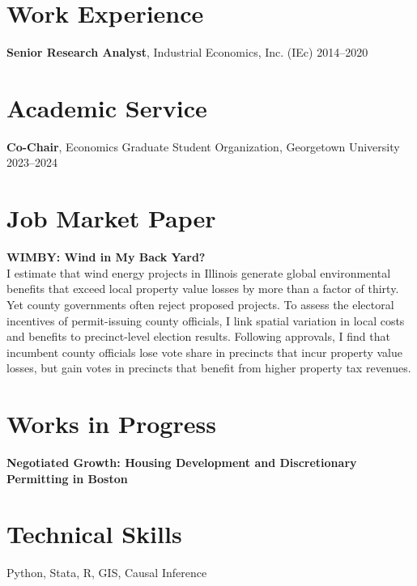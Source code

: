 \documentclass[11pt]{article}
\begin{document}
\section*{Work Experience}

\textbf{Senior Research Analyst}, Industrial Economics, Inc. (IEc) \hfill 2014–2020

\section*{Academic Service}

\textbf{Co-Chair}, Economics Graduate Student Organization, Georgetown University \hfill 2023–2024

\section*{Job Market Paper}

\textbf{WIMBY: Wind in My Back Yard?} \\
I estimate that wind energy projects in Illinois generate global environmental benefits that exceed local property value losses by more than a factor of thirty. Yet county governments often reject proposed projects. To assess the electoral incentives of permit-issuing county officials, I link spatial variation in local costs and benefits to precinct-level election results. Following approvals, I find that incumbent county officials lose vote share in precincts that incur property value losses, but gain votes in precincts that benefit from higher property tax revenues.

\section*{Works in Progress}
\textbf{Negotiated Growth: Housing Development and Discretionary Permitting in Boston}



\section*{Technical Skills}
Python, Stata, R, GIS, Causal Inference

\end{document}
